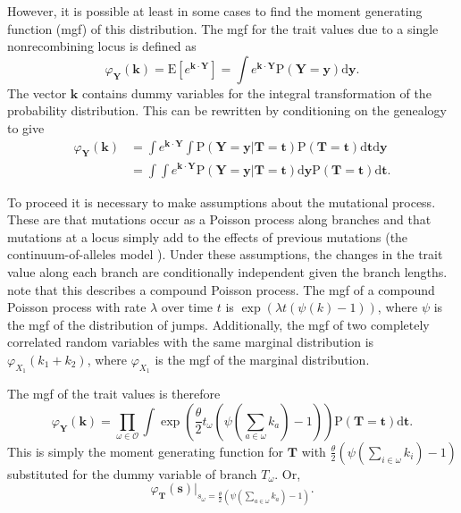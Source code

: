 \documentclass{article}
\newcommand{\E}{\mathrm{E}}
\newcommand{\Pro}{\mathrm{P}}
\begin{document}
However, it is possible at least in some cases to find the moment generating
function (mgf) of this distribution. The mgf for the trait values due to a
single nonrecombining locus is defined as
\begin{equation}
  \label{eq:mgfdef}
  \varphi_{\mathbf{Y}}(\mathbf{k}) = \E\left[ e^{\mathbf{k} \cdot \mathbf{Y}} \right] =
  \int e^{\mathbf{k} \cdot \mathbf{Y}} \Pro(\mathbf{Y}=\mathbf{y}) \mbox{d}\mathbf{y}.
\end{equation}
The vector $\mathbf{k}$ contains dummy variables for the integral transformation
of the probability distribution. This can be rewritten by conditioning on the
genealogy to give
\begin{align}
  \varphi_{\mathbf{Y}}(\mathbf{k}) &= \int e^{\mathbf{k} \cdot \mathbf{Y}}
  \int \Pro(\mathbf{Y}=\mathbf{y} | \mathbf{T}=\mathbf{t}) \Pro(\mathbf{T}=\mathbf{t})
  \mbox{d}\mathbf{t} \mbox{d}\mathbf{y}\\
  &= \int \int e^{\mathbf{k} \cdot \mathbf{Y}} \Pro(\mathbf{Y}=\mathbf{y} | \mathbf{T}=\mathbf{t}) \mbox{d}\mathbf{y}
  \Pro(\mathbf{T}=\mathbf{t})
  \mbox{d}\mathbf{t}.
\end{align}

To proceed it is necessary to make assumptions about the mutational process.
These are that mutations occur as a Poisson process along branches and that
mutations at a locus simply add to the effects of previous mutations (the
continuum-of-alleles model \citep{Kimura1965}). Under these assumptions, the
changes in the trait value along each branch are conditionally independent given
the branch lengths. \citet{Schraiber2015} note that this describes a compound
Poisson process. The mgf of a compound Poisson process with rate $\lambda$ over
time $t$ is $\exp(\lambda t (\psi(k)-1))$, where $\psi$ is the mgf of the
distribution of jumps. Additionally, the mgf of two completely correlated random
variables with the same marginal distribution is $\varphi_{X_1}(k_1+k_2)$, where
$\varphi_{X_1}$ is the mgf of the marginal distribution.

The mgf of the trait values is therefore
\begin{equation}
  \label{eq:fullmgf}
  \varphi_{\mathbf{Y}}(\mathbf{k}) = \prod_{\omega \in \mathcal{O}}
  \int \exp\left( \frac{\theta}{2} t_{\omega} \left( \psi\left(\sum_{a \in \omega}k_{a}\right) -1 \right)\right)
  \Pro(\mathbf{T}=\mathbf{t})\mbox{d}\mathbf{t}.
\end{equation}
This is simply the moment generating function for $\mathbf{T}$ with
$\frac{\theta}{2} \left( \psi(\sum_{i \in \omega}k_{i}) -1 \right)$
substituted for the dummy variable of branch $T_{\omega}$. Or,
\begin{equation}
  \label{eq:sub}
  \varphi_{\mathbf{T}}(\mathbf{s})\Bigr|_{s_{\omega}=\frac{\theta}{2} \left( \psi\left(\sum_{a \in \omega}k_{a}\right) -1 \right)}.
\end{equation}
\end{document}
